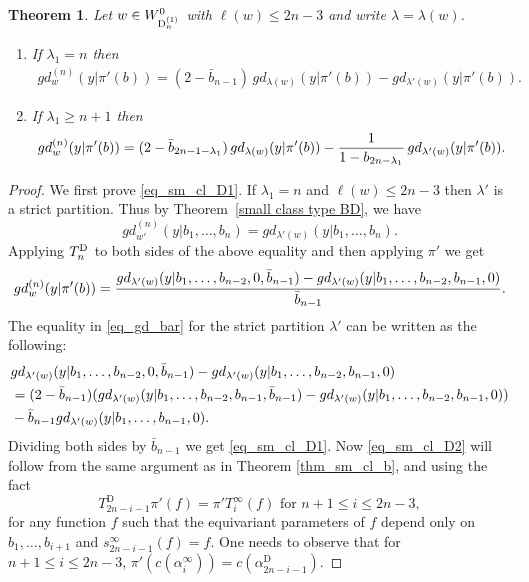 \documentclass[a4paper]{amsart}
\newtheorem{thm}{Theorem}[section]
\theoremstyle{remark}
\numberwithin{equation}{section}
\begin{document}
\begin{thm}\label{thm_sm_cl_type_D}
Let $w\in \WDgr{n}$ with $\ell(w)\leq 2n-3$ and write $\lambda=\lambda(w)$.
\begin{enumerate}
    \item If $\lambda_1=n$ then
    \begin{align}\label{eq_sm_cl_D1}
        gd_w^{(n)}(y| \pi'(b))
        =
        (2-\bar{b}_{n-1})\,gd_{\lambda(w)}(y|\pi'(b) )-gd_{\lambda'(w)}(y| \pi'(b)).
    \end{align}

    \item If $\lambda_1\geq n+1$ then
    \begin{align}\label{eq_sm_cl_D2}
        \gd{w}{n}(y| \pi'(b))
        =
        (2-\bar{b}_{2n-1-\lambda_1})\,
        gd_{\lambda(w)}(y| \pi'(b))
        -
        \frac{1}{1-b_{2n-\lambda_1}}\,
        gd_{\lambda'(w)}(y| \pi'(b)).
    \end{align}
\end{enumerate}
\end{thm}
\begin{proof}
    We first prove
    \eqref{eq_sm_cl_D1}. If $\lambda_1=n$ and $\ell(w)\le 2n-3$ then $\lambda'$ is a strict partition. Thus by Theorem~\ref{small class type BD}, we have
\[
    gd_{w'}^{(n)}(y| b_1,\dots,b_n)
    =
    gd_{\lambda'(w)}(y| b_1,\dots,b_n).
\]
Applying $T_n^{\D{}}$ to both sides of the above equality and then applying $\pi'$ we get
$$gd_{w}^{(n)}(y| \pi'(b))=\frac{gd_{\la'(w)}(y| b_1,\ldots,b_{n-2},0,\bar{b}_{n-1})
-gd_{\la'(w)}(y| b_1,\ldots,b_{n-2},b_{n-1},0)}{\bar{b}_{n-1}}.$$
  The equality in \eqref{eq_gd_bar} for the strict partition $\lambda'$ can be written as the following:
    \begin{align*}
    &gd_{\la'(w)}(y| b_1,\ldots,b_{n-2},0,\bar{b}_{n-1})
-gd_{\la'(w)}(y| b_1,\ldots,b_{n-2},b_{n-1},0)\\
&=(2-\bar{b}_{n-1})(
gd_{\la'(w)}(y| b_1,\ldots,b_{n-2},b_{n-1},\bar{b}_{n-1})-gd_{\la'(w)}(y| b_1,\dots,b_{n-2},b_{n-1},0))\\
&-\bar{b}_{n-1}gd_{\la'(w)}(y| b_1,\dots,b_{n-1},0).
    \end{align*}
    Dividing both sides by $\bar{b}_{n-1}$ we get \eqref{eq_sm_cl_D1}. Now \eqref{eq_sm_cl_D2} will follow from the same argument as in Theorem \ref{thm_sm_cl_b}, and using the fact 
    $$T_{2n-i-1}^{\mathrm{D}}\pi'(f)=\pi'T_i^{\infty}(f)\text{ for }n+1\leq i\leq 2n-3,$$
 for any function $f$ such that the equivariant parameters of $f$ depend only on $b_1,\dots, b_{i+1}$ and $s_{2n-i-1}^\infty(f)=f$.
   One needs to observe that for $n+1\le i\le 2n-3$, $\pi'(c(\alpha_{i}^{\infty}))=c(\alpha_{2n-i-1}^{\mathrm{D}})$. 
\end{proof}
\end{document}
